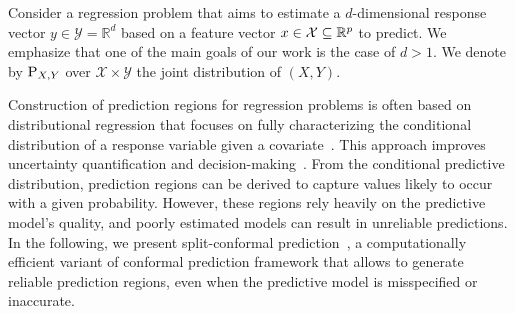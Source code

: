   
  Consider a regression problem that aims to estimate a $d$-dimensional response vector $y \in \mathcal{Y} = \mathbb{R}^d$ based on a feature vector $x \in \mathcal{X} \subseteq \mathbb{R}^p$ to predict. We emphasize that one of the main goals of our work is the case of $d > 1$. We denote by $\textup{P}_{X,Y}$ over $\mathcal{X} \times \mathcal{Y}$ the joint distribution of $(X,Y)$. %

  Construction of prediction regions for regression problems is often based on distributional regression that focuses on fully characterizing the conditional distribution of a response variable given a covariate~\cite{klein2024distributional}. This approach improves uncertainty quantification and decision-making~\cite{Berger2019-ju}. From the conditional predictive distribution, prediction regions can be derived to capture values likely to occur with a given probability. However, these regions rely heavily on the predictive model's quality, and poorly estimated models can result in unreliable predictions. 
  In the following, we present split-conformal prediction~\citep[SCP;][]{papadopoulos2002inductive}, a computationally efficient variant of conformal prediction framework that allows to generate reliable prediction regions, even when the predictive model is misspecified or inaccurate.


